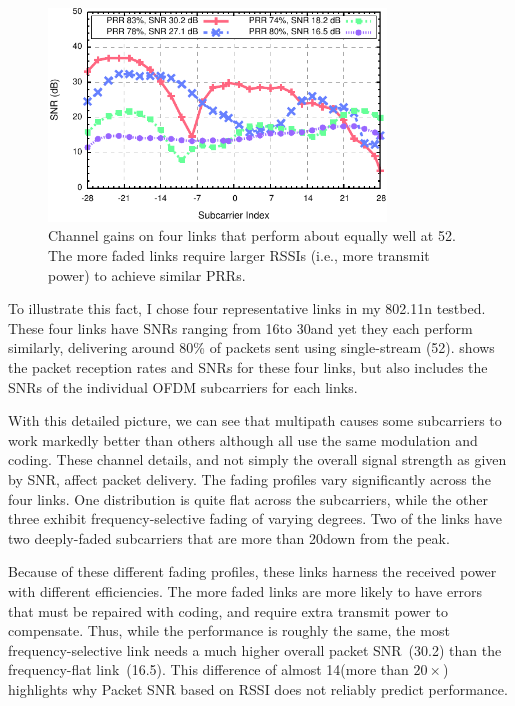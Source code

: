 \begin{figure}[t]
  \centering
  \includegraphics[width=0.8\textwidth]{figures/fsf_shape.pdf}
  \caption[Channel gains on four links that perform about equally well at 52\Mbps]{Channel gains on four links that perform about equally well at 52\Mbps. The more faded links require larger RSSIs (i.e., more transmit power) to achieve similar PRRs.}
  \label{fig:example_fsf_shape}

\end{figure}

To illustrate this fact, I chose four representative links in my 802.11n testbed. These four links have SNRs ranging from 16\dB to 30\dB and yet they each perform similarly, delivering around 80\% of packets sent using single-stream  (52\Mbps).  shows the packet reception rates and SNRs for these four links, but also includes the SNRs of the individual OFDM subcarriers for each links.

With this detailed picture, we can see that multipath causes some subcarriers to work markedly better than others although all use the same modulation and coding. These channel details, and not simply the overall signal strength as given by SNR, affect packet delivery. The fading profiles vary significantly across the four links. One distribution is quite flat across the subcarriers, while the other three exhibit frequency-selective fading of varying degrees. Two of the links have two deeply-faded subcarriers that are more than 20\dB down from the peak.

Because of these different fading profiles, these links harness the received power with different efficiencies.
The more faded links are more likely to have errors that must be repaired with coding, and require extra transmit power to compensate. Thus, while the performance is roughly the same, the most frequency-selective link needs a much higher overall packet SNR~(30.2\dB) than the frequency-flat link~(16.5\dB). This difference of almost 14\dB (more than $20\times$) highlights why Packet SNR based on RSSI does not reliably predict performance.

